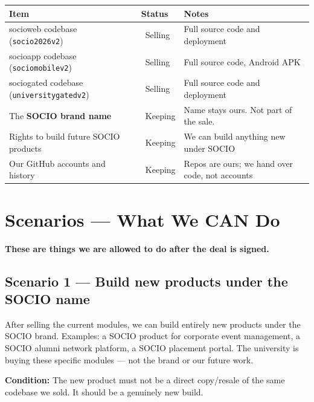 \documentclass[12pt,a4paper]{article}
\newcommand{\yes}{\textcolor{green}{\textbf{\checkmark}}}
\newcommand{\no}{\textcolor{red}{\textbf{\texttimes}}}
\begin{document}
\begin{tabularx}{\textwidth}{L{5cm} L{1.5cm} X}
\toprule
{}
\textbf{Item} & \textbf{Status} & \textbf{Notes} \\
\midrule
socioweb codebase (\texttt{socio2026v2}) & \yes\ Selling & Full source code and deployment \\
socioapp codebase (\texttt{sociomobilev2}) & \yes\ Selling & Full source code, Android APK \\
sociogated codebase (\texttt{universitygatedv2}) & \yes\ Selling & Full source code and deployment \\
\midrule
The \textbf{SOCIO brand name} & \no\ Keeping & Name stays ours. Not part of the sale. \\
Rights to build future SOCIO products & \no\ Keeping & We can build anything new under SOCIO \\
Our GitHub accounts and history & \no\ Keeping & Repos are ours; we hand over code, not accounts \\
\bottomrule
\end{tabularx}

\section{Scenarios — What We CAN Do}

\begin{canbox}
\textbf{\color{green} These are things we are allowed to do after the deal is signed.}
\end{canbox}

\vspace{0.4cm}

\subsection{Scenario 1 — Build new products under the SOCIO name}

After selling the current modules, we can build entirely new products under the SOCIO brand. Examples: a SOCIO product for corporate event management, a SOCIO alumni network platform, a SOCIO placement portal. The university is buying these specific modules — not the brand or our future work.

\textbf{Condition:} The new product must not be a direct copy/resale of the same codebase we sold. It should be a genuinely new build.

\vspace{0.3cm}
\end{document}

